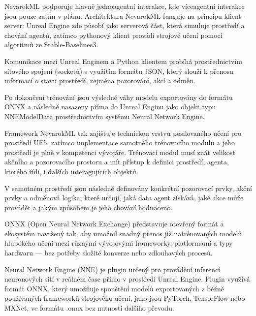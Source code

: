 NevarokML podporuje hlavně jednoagentní interakce, kde víceagentní interakce jsou pouze zatím v plánu. Architektura NevarokML funguje na principu klient–server: Unreal Engine zde působí jako serverová část, která simuluje prostředí a chování agentů, zatímco pythonový klient provádí strojové učení pomocí algoritmů ze Stable-Baselines3.

Komunikace mezi Unreal Enginem a Python klientem probíhá prostřednictvím síťového spojení (socketů) s využitím formátu JSON, který slouží k přenosu informací o stavu prostředí, zejména pozorování, akcí a odměn.

Po dokončení trénování jsou výsledné váhy modelu exportovány do formátu ONNX a následně nasazeny přímo do Unreal Enginu jako objekt typu NNEModelData prostřednictvím systému Neural Network Engine.

Framework NevarokML tak zajišťuje technickou vrstvu posilovaného učení pro prostředí UE5, zatímco implementace samotného trénovacího modulu a jeho prostředí je plně v kompetenci vývojáře. Trénovací modul musí znát velikost akčního a pozorovacího prostoru a mít přístup k definici prostředí, agenta, kterého řídí, i dalších interagujících objektů.

V samotném prostředí jsou následně definovány konkrétní pozorovací prvky, akční prvky a odměnová logika, které určují, jaká data agent získává, jaké akce může provádět a jakým způsobem je jeho chování hodnoceno.

ONNX\cite{ONNX2025} (Open Neural Network Exchange) představuje otevřený formát a ekosystém navržený tak, aby umožnil snadný přenos již natrénovaných modelů hlubokého učení mezi různými vývojovými frameworky, platformami a typy hardwaru — bez potřeby složité konverze nebo zdlouhavých procesů.

Neural Network Engine (NNE)\cite{NNE2025} je plugin určený pro provádění inferencí neuronových sítí v reálném čase přímo v prostředí Unreal Engine. Plugin využívá formát ONNX, který umožňuje spouštění modelů exportovaných z běžně používaných frameworků strojového učení, jako jsou PyTorch, TensorFlow nebo MXNet, ve formátu .onnx bez nutnosti dalšího převodu.

\newpage

